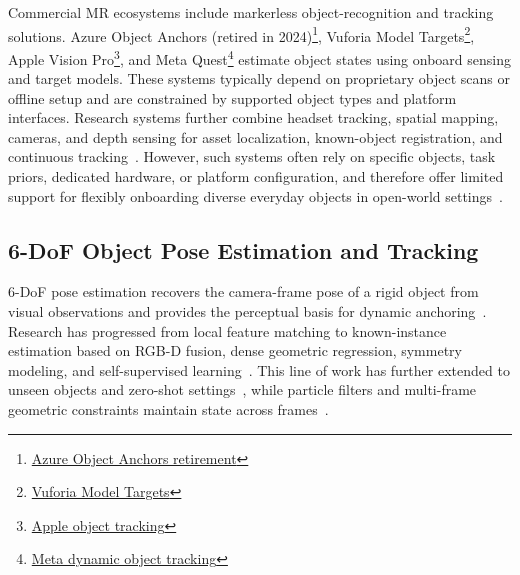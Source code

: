 \documentclass[review]{vgtc}
\begin{document}
Commercial MR ecosystems include markerless object-recognition and tracking solutions. Azure Object Anchors (retired in 2024)\footnote{\href{https://learn.microsoft.com/en-us/lifecycle/end-of-support/end-of-support-2024}{Azure Object Anchors retirement}}, Vuforia Model Targets\footnote{\href{https://developer.vuforia.com/library/vuforia-engine/images-and-objects/model-targets/model-targets/}{Vuforia Model Targets}}, Apple Vision Pro\footnote{\href{https://developer.apple.com/documentation/visionos/implementing-object-tracking-in-your-app}{Apple object tracking}}, and Meta Quest\footnote{\href{https://developers.meta.com/horizon/documentation/native/android/mobile-dynamic-object-tracker/}{Meta dynamic object tracking}} estimate object states using onboard sensing and target models. These systems typically depend on proprietary object scans or offline setup and are constrained by supported object types and platform interfaces. Research systems further combine headset tracking, spatial mapping, cameras, and depth sensing for asset localization, known-object registration, and continuous tracking~\cite{fan2021assettracking,doughty2022hmdegopose,pollabauer2023hololens,martingomez2024sttar,trojak2025mixedpose,greene2025markerless,trojak2026markerless,gbot2024}. However, such systems often rely on specific objects, task priors, dedicated hardware, or platform configuration, and therefore offer limited support for flexibly onboarding diverse everyday objects in open-world settings~\cite{hurt2025surrealitycv}.

\subsection{6-DoF Object Pose Estimation and Tracking}

6-DoF pose estimation recovers the camera-frame pose of a rigid object from visual observations and provides the perceptual basis for dynamic anchoring~\cite{aguirrezabal2026survey}. Research has progressed from local feature matching to known-instance estimation based on RGB-D fusion, dense geometric regression, symmetry modeling, and self-supervised learning~\cite{densefusion2019,epos2020,gdrnet2021,self6d2020}. This line of work has further extended to unseen objects and zero-shot settings~\cite{gen6d2022,megapose2022,lin2024sam6d,ornek2024foundpose,moon2025coop,foundationpose2024}, while particle filters and multi-frame geometric constraints maintain state across frames~\cite{poserbpf2021,bundletrack2021}.
\end{document}
